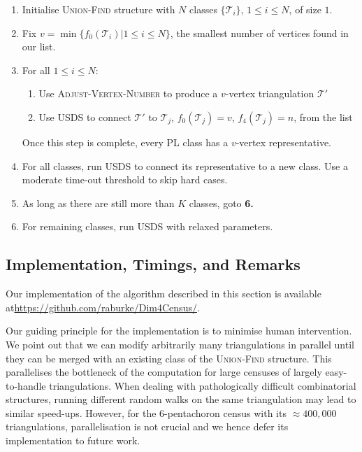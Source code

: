 \documentclass[pdflatex,sn-mathphys-num]{sn-jnl}
\theoremstyle{thmstyleone}%
\theoremstyle{thmstyletwo}%
\theoremstyle{thmstylethree}%
\newcommand{\tri}{\mathcal{T}}
\theoremstyle{remark}
\begin{document}
\begin{tcolorbox}[colframe=blue!75!green!75, title=Main Algorithm]
    \begin{enumerate}
    \item Initialise \textsc{Union-Find} structure with $N$ classes $\{\tri_i \}$, $ 1\leq i \leq N$, of size $1$.
    \item Fix $v = \min \{ f_0 (\tri_i) | 1 \leq i \leq N \}$, the smallest number of vertices found in our list.
    \item For all $1 \leq i \leq N$:
    \begin{enumerate}
        \item Use \textsc{Adjust-Vertex-Number} to produce a $v$-vertex triangulation $\tri'$ 
        \item Use USDS to connect $\tri'$ to $\tri_j$, $f_0(\tri_j)=v$, $f_4(\tri_j) = n$, from the list
    \end{enumerate}
    Once this step is complete, every PL class has a $v$-vertex representative.
    \item For all classes, run USDS to connect its representative to a new class. Use a moderate time-out threshold to skip hard cases.
    \item As long as there are still more than $K$ classes, goto {\bf 6.}
    \item For remaining classes, run USDS with relaxed parameters.
    \end{enumerate}
\end{tcolorbox}

\subsection{Implementation, Timings, and Remarks}
\label{ssec:implementation}

Our implementation of the algorithm described in this section is available at\newline\url{https://github.com/raburke/Dim4Census/}.

Our guiding principle for the implementation is to minimise human intervention. We point out that we can modify arbitrarily many triangulations in parallel until they can be merged with an existing class of the \textsc{Union-Find} structure. This parallelises the bottleneck of the computation for large censuses of largely easy-to-handle triangulations. When dealing with pathologically difficult combinatorial structures, running different random walks on the same triangulation may lead to similar speed-ups. However, for the $6$-pentachoron census with its $\approx 400,000$ triangulations, parallelisation is not crucial and we hence defer its implementation to future work.
\end{document}
